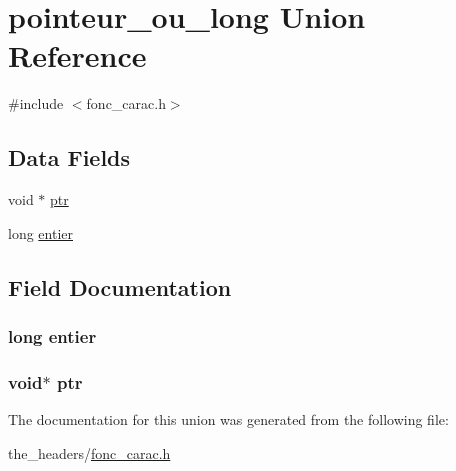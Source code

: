\hypertarget{unionpointeur__ou__long}{}\section{pointeur\+\_\+ou\+\_\+long Union Reference}
\label{unionpointeur__ou__long}


{\ttfamily \#include $<$fonc\+\_\+carac.\+h$>$}

\subsection*{Data Fields}
\begin{DoxyCompactItemize}
\item 
void $\ast$ \hyperlink{unionpointeur__ou__long_add9af9569af79ec26dd741fb226b38ba}{ptr}
\item 
long \hyperlink{unionpointeur__ou__long_a2769151b551865ab5abe5eb319425f51}{entier}
\end{DoxyCompactItemize}


\subsection{Field Documentation}
\subsubsection[{\texorpdfstring{entier}{entier}}]{\setlength{\rightskip}{0pt plus 5cm}long entier}\hypertarget{unionpointeur__ou__long_a2769151b551865ab5abe5eb319425f51}{}\label{unionpointeur__ou__long_a2769151b551865ab5abe5eb319425f51}
\subsubsection[{\texorpdfstring{ptr}{ptr}}]{\setlength{\rightskip}{0pt plus 5cm}void$\ast$ ptr}\hypertarget{unionpointeur__ou__long_add9af9569af79ec26dd741fb226b38ba}{}\label{unionpointeur__ou__long_add9af9569af79ec26dd741fb226b38ba}


The documentation for this union was generated from the following file\+:\begin{DoxyCompactItemize}
\item 
the\+\_\+headers/\hyperlink{fonc__carac_8h}{fonc\+\_\+carac.\+h}\end{DoxyCompactItemize}
